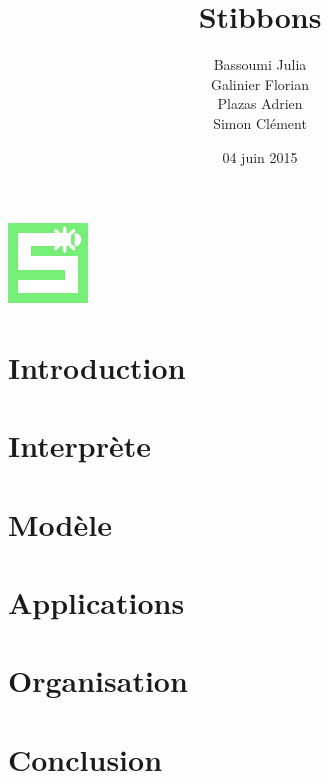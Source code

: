 \documentclass[11pt,handout]{beamer}
\title{Stibbons}
\author{Bassoumi Julia \\ Galinier Florian \\ Plazas Adrien \\ Simon Clément}
\date{04 juin 2015}
\begin{document}
\begin{frame}
\includegraphics[height=0.2\textheight]{doc/gestionProjet/stibbons.pdf}\\
\titlepage
\end{frame}

\section{Introduction}

 
\section{Interprète}


\section{Modèle}


\section{Applications}


\section{Organisation}


\section{Conclusion}

\end{document}
